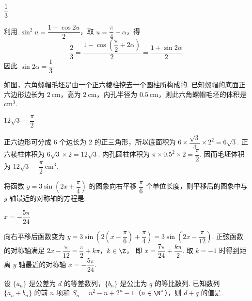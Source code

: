 \begin{answer}
\(\dfrac13\)
\end{answer}

\begin{solution}
利用 \(\sin^2u=\dfrac{1-\cos2u}{2}\)，取 \(u=\dfrac\pi4+\alpha\)，得
\[
\dfrac23=\dfrac{1-\cos\left(\dfrac\pi2+2\alpha\right)}2=\dfrac{1+\sin2\alpha}2
\]
因此 \(\sin2\alpha=\dfrac13\).
\end{solution}

\begin{problem}
如图，六角螺帽毛坯是由一个正六棱柱挖去一个圆柱所构成的. 已知螺帽的底面正六边形边长为 \(2\mathrm{~cm}\)，高为 \(2\mathrm{~cm}\)，内孔半径为 \(0.5\mathrm{~cm}\)，则此六角螺帽毛坯的体积是\fillinblank{}\(\mathrm{cm}^3\).

\end{problem}

\begin{answer}
\(12\sqrt3-\dfrac\pi2\)
\end{answer}

\begin{solution}
正六边形可分成 \(6\) 个边长为 \(2\) 的正三角形，所以底面积为 \(6\times\dfrac{\sqrt3}{4}\times2^2=6\sqrt3\). 正六棱柱体积为 \(6\sqrt3\times2=12\sqrt3\). 内孔圆柱体积为 \(\pi\times0.5^2\times2=\dfrac\pi2\). 因而毛坯体积为 \(12\sqrt3-\dfrac\pi2\ \mathrm{cm}^3\).
\end{solution}

\begin{problem}
将函数 \(y=3\sin\!\left(2x+\dfrac\pi4\right)\) 的图象向右平移 \(\dfrac\pi6\) 个单位长度，则平移后的图象中与 \(y\) 轴最近的对称轴的方程是\fillinblank{}.
\end{problem}

\begin{answer}
\(x=-\dfrac{5\pi}{24}\)
\end{answer}

\begin{solution}
向右平移后函数变为 \(y=3\sin\!\left(2\left(x-\dfrac\pi6\right)+\dfrac\pi4\right)=3\sin\!\left(2x-\dfrac\pi{12}\right)\). 正弦函数的对称轴满足
\(2x-\dfrac\pi{12}=\dfrac\pi2+k\pi\)，\(k\in\Z\)，
即 \(x=\dfrac{7\pi}{24}+\dfrac{k\pi}{2}\). 取 \(k=-1\) 时得到距离 \(y\) 轴最近的对称轴 \(x=-\dfrac{5\pi}{24}\).
\end{solution}

\begin{problem}
设 \(\{a_n\}\) 是公差为 \(d\) 的等差数列，\(\{b_n\}\) 是公比为 \(q\) 的等比数列. 已知数列 \(\{a_n+b_n\}\) 的前 \(n\) 项和 \(S_n=n^2-n+2^n-1\)（\(n\in\N^*\)），则 \(d+q\) 的值是\fillinblank{}.
\end{problem}

